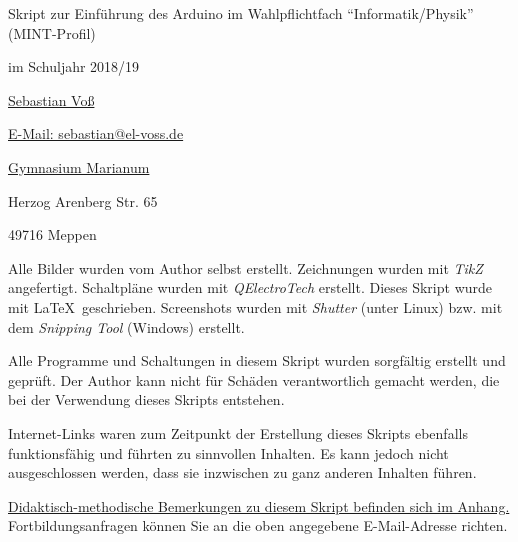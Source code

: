 

	






\thispagestyle{empty}
\clearpage

\vspace{2\baselineskip}
Skript zur Einführung des Arduino im Wahlpflichtfach \enquote{Informatik/Physik} (MINT-Profil)

im Schuljahr 2018/19

\href{https://www.el-voss.de/}{Sebastian Voß}

\href{mailto:sebastian@el-voss.de}{E-Mail: sebastian@el-voss.de}

\vspace{2\baselineskip}

\href{http://marianum-meppen.de/}{Gymnasium Marianum}

Herzog Arenberg Str. 65

49716 Meppen

\vspace{2\baselineskip}

Alle Bilder wurden vom Author selbst erstellt. Zeichnungen wurden mit \emph{TikZ} angefertigt. Schaltpläne wurden mit \emph{QElectroTech} erstellt. Dieses Skript wurde mit \LaTeX ~geschrieben. Screenshots wurden mit \emph{Shutter} (unter Linux) bzw. mit dem \emph{Snipping Tool} (Windows) erstellt. 

\vspace{\baselineskip}
Alle Programme und Schaltungen in diesem Skript wurden sorgfältig erstellt und geprüft. Der Author kann nicht für Schäden verantwortlich gemacht werden, die bei der Verwendung dieses Skripts entstehen.

\vspace{\baselineskip}
Internet-Links waren zum Zeitpunkt der Erstellung dieses Skripts ebenfalls funktionsfähig und führten zu sinnvollen Inhalten. Es kann jedoch nicht ausgeschlossen werden, dass sie inzwischen zu ganz anderen Inhalten führen.
\vspace{2\baselineskip}

\hyperref[kap:didaktik]{Didaktisch-methodische Bemerkungen zu diesem Skript befinden sich im Anhang.} Fortbildungsanfragen können Sie an die oben angegebene E-Mail-Adresse richten.
\vspace{15\baselineskip}


